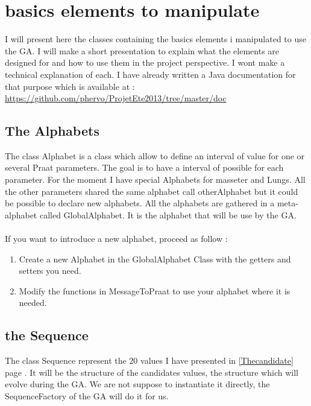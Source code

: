\documentclass[12pt]{report}
\begin{document}
\section{basics elements to manipulate}
I will present here the classes containing the basics elements i manipulated to use the GA.
I will make a short presentation to explain what the elements are designed for and how to use them in the project perspective. I wont make a technical explanation of each. I have already written a Java documentation for that purpose which is available at : \url{https://github.com/phervo/ProjetEte2013/tree/master/doc}

\subsection{The Alphabets}
The class Alphabet is a class which allow to define an interval of value for one or several Praat parameters.
The goal is to have a interval of possible for each parameter.
For the moment I have  special Alphabets for masseter and Lungs. All the other parameters shared the same alphabet call otherAlphabet but it could be possible to declare new alphabets. All the alphabets are gathered in a meta-alphabet called GlobalAlphabet. It is the alphabet that will be use by the GA.

\paragraph*{}
If you want to introduce a new alphabet, proceed as follow :
\begin{enumerate}
\item Create a new Alphabet in the GlobalAlphabet Class with the getters and setters you need.
\item Modify the functions in MessageToPraat to use your alphabet where it is needed.
\end{enumerate}

\subsection{the Sequence}
The class Sequence represent the 20 values I have presented in \ref{Thecandidate} page \pageref{Thecandidate}. It will be the structure of the candidates values, the structure which will evolve during the GA. We are not suppose to instantiate it directly, the SequenceFactory of the GA will do it for us.
\end{document}
